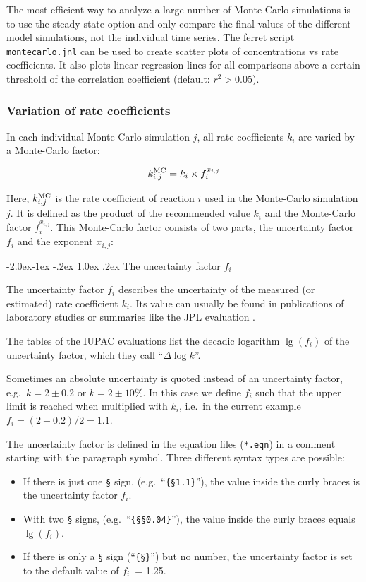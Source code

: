 \documentclass[twoside]{article}
\makeatletter
\newcommand{\egcite}[1]{\citep[e.g.][]{#1}}
\renewcommand\paragraph{\@startsection{paragraph}{4}{\z@}%
  {-2.0ex\@plus -1ex \@minus -.2ex}%
  {1.0ex \@plus .2ex}%
  {\normalfont\normalsize\bfseries}}
\makeatother
\begin{document}
The most efficient way to analyze a large number of Monte-Carlo
simulations is to use the steady-state option and only compare the
final values of the different model simulations, not the individual time
series. The ferret script \verb|montecarlo.jnl| can be used to create
scatter plots of concentrations vs rate coefficients. It also plots
linear regression lines for all comparisons above a certain threshold of
the correlation coefficient (default: $r^2>0.05$).

\subsubsection{Variation of rate coefficients}

In each individual Monte-Carlo simulation $j$, all rate coefficients
$k_i$ are varied by a Monte-Carlo factor:

\begin{equation}
  k^{\rm MC}_{i,j} = k_i \times f_i^{x_{i,j}}
\end{equation}

Here, $k^{\rm MC}_{i,j}$ is the rate coefficient of reaction $i$ used in
the Monte-Carlo simulation $j$. It is defined as the product of the
recommended value $k_i$ and the Monte-Carlo factor $f_i^{x_{i,j}}$. This
Monte-Carlo factor consists of two parts, the uncertainty factor $f_i$
and the exponent $x_{i,j}$:

\paragraph{The uncertainty factor $f_i$} 

The uncertainty factor $f_i$ describes the uncertainty of the measured
(or estimated) rate coefficient $k_i$. Its value can usually be found in
publications of laboratory studies or summaries like the JPL evaluation
\citep{1945}.

The tables of the IUPAC evaluations \egcite{1759} list the decadic
logarithm $\lg(f_i)$ of the uncertainty factor, which they call
``$\Delta\log k$''.

Sometimes an absolute uncertainty is quoted instead of an uncertainty
factor, e.g.\ $k = 2 \pm 0.2$ or $k = 2 \pm 10\%$. In this case we
define $f_i$ such that the upper limit is reached when multiplied with
$k_i$, i.e.\ in the current example $f_i = (2+0.2)/2 = 1.1$.

The uncertainty factor is defined in the equation files (\verb|*.eqn|)
in a comment starting with the paragraph symbol. Three different syntax
types are possible:
\begin{itemize}
\item If there is just one \verb|§| sign, (e.g.\ ``\verb|{§1.1}|''), the
  value inside the curly braces is the uncertainty factor $f_i$.
\item With two \verb|§| signs, (e.g.\ ``\verb|{§§0.04}|''), the value
  inside the curly braces equals $\lg(f_i)$.
\item If there is only a \verb|§| sign (``\verb|{§}|'') but no number,
  the uncertainty factor is set to the default value of $f_i$~= 1.25.
\end{itemize}
\end{document}
